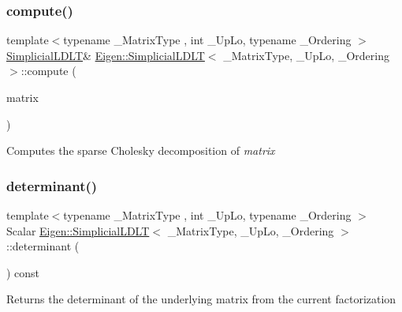 \subsubsection{\texorpdfstring{compute()}{compute()}}
{\footnotesize\ttfamily template$<$typename \+\_\+\+Matrix\+Type , int \+\_\+\+Up\+Lo, typename \+\_\+\+Ordering $>$ \\
\mbox{\hyperlink{class_eigen_1_1_simplicial_l_d_l_t}{Simplicial\+L\+D\+LT}}\& \mbox{\hyperlink{class_eigen_1_1_simplicial_l_d_l_t}{Eigen\+::\+Simplicial\+L\+D\+LT}}$<$ \+\_\+\+Matrix\+Type, \+\_\+\+Up\+Lo, \+\_\+\+Ordering $>$\+::compute (\begin{DoxyParamCaption}\item[{const Matrix\+Type \&}]{matrix }\end{DoxyParamCaption})\hspace{0.3cm}{\ttfamily [inline]}}

Computes the sparse Cholesky decomposition of {\itshape matrix} \mbox{\label{class_eigen_1_1_simplicial_l_d_l_t_aa25042f3b49880f5e487d468ea20b1b7}} 
\subsubsection{\texorpdfstring{determinant()}{determinant()}}
{\footnotesize\ttfamily template$<$typename \+\_\+\+Matrix\+Type , int \+\_\+\+Up\+Lo, typename \+\_\+\+Ordering $>$ \\
Scalar \mbox{\hyperlink{class_eigen_1_1_simplicial_l_d_l_t}{Eigen\+::\+Simplicial\+L\+D\+LT}}$<$ \+\_\+\+Matrix\+Type, \+\_\+\+Up\+Lo, \+\_\+\+Ordering $>$\+::determinant (\begin{DoxyParamCaption}{ }\end{DoxyParamCaption}) const\hspace{0.3cm}{\ttfamily [inline]}}

\begin{DoxyReturn}{Returns}
the determinant of the underlying matrix from the current factorization 
\end{DoxyReturn}
\mbox{\label{class_eigen_1_1_simplicial_l_d_l_t_a8cf16bd92a712d36310397972bdef044}} 
